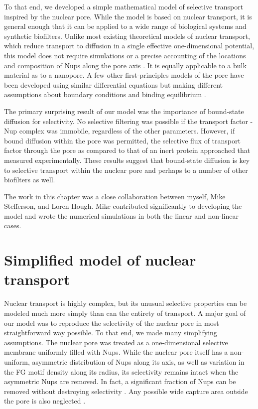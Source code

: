 To that end, we developed a simple mathematical model of selective transport inspired by the nuclear pore.  While the model is based on nuclear transport, it is general enough that it can be applied to a wide range of biological systems and synthetic biofilters.  Unlike most existing theoretical models of nuclear transport, which reduce transport to diffusion in a single effective one-dimensional potential, this model does not require simulations or a precise accounting of the locations and composition of Nups along the pore axis \cite{pulupa17, vovk16,tagliazucchi13, tu13, timney16}.  It is equally applicable to a bulk material as to a nanopore.  A few other first-principles models of the pore have been developed using similar differential equations but making different assumptions about boundary conditions and binding equilibrium \cite{zilman07,yang18}.

The primary surprising result of our model was the importance of bound-state diffusion for selectivity.  No selective filtering was possible if the transport factor - Nup complex was immobile, regardless of the other parameters.  However, if bound diffusion within the pore was permitted, the selective flux of transport factor through the pore as compared to that of an inert protein approached that measured experimentally.  These results suggest that bound-state diffusion is key to selective transport within the nuclear pore and perhaps to a number of other biofilters as well.

The work in this chapter was a close collaboration between myself, Mike Stefferson, and Loren Hough.  Mike contributed significantly to developing the model and wrote the numerical simulations in both the linear and non-linear cases.

\section{Simplified model of nuclear transport}
\label{sec:model}

Nuclear transport is highly complex, but its unusual selective properties can be modeled much more simply than can the entirety of transport.  A major goal of our model was to reproduce the selectivity of the nuclear pore in most straightforward way possible.  To that end, we made many simplifying assumptions.  The nuclear pore was treated as a one-dimensional selective membrane uniformly filled with Nups.  While the nuclear pore itself has a non-uniform, asymmetric distribution of Nups along its axis, as well as variation in the FG motif density along its radius, its selectivity remains intact when the asymmetric Nups are removed.  In fact, a significant fraction of Nups can be removed without destroying selectivity \cite{strawn04, zeitler04,kowalczyk11, jovanovic-talisman09}.  Any possible wide capture area outside the pore is also neglected \cite{pagliara14}.

